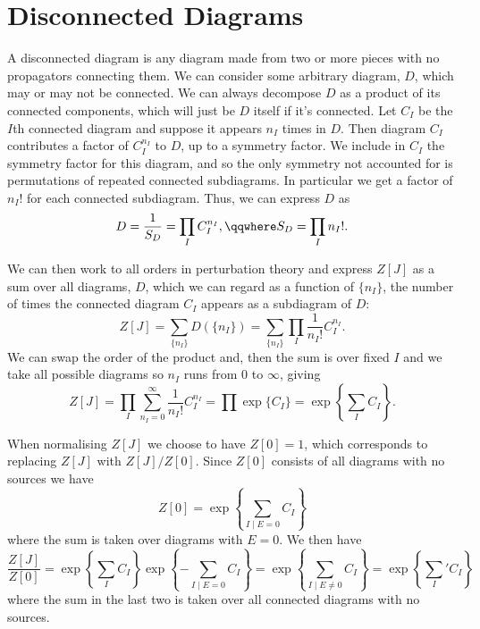 \documentclass[fleqn]{NotesClass}
\begin{document}
    \section{Disconnected Diagrams}\label{sec:disconnected diagrams}
    A disconnected diagram is any diagram made from two or more pieces with no propagators connecting them.
    We can consider some arbitrary diagram, \(D\), which may or may not be connected.
    We can always decompose \(D\) as a product of its connected components, which will just be \(D\) itself if it's connected.
    Let \(C_I\) be the \(I\)th connected diagram and suppose it appears \(n_I\) times in \(D\).
    Then diagram \(C_I\) contributes a factor of \(C_I^{n_I}\) to \(D\), up to a symmetry factor.
    We include in \(C_I\) the symmetry factor for this diagram, and so the only symmetry not accounted for is permutations of repeated connected subdiagrams.
    In particular we get a factor of \(n_I!\) for each connected subdiagram.
    Thus, we can express \(D\) as
    \begin{equation}
        D = \frac{1}{S_D} = \prod_I C_I^{n_I}, \qqwhere S_D = \prod_I n_I!.
    \end{equation}
    
    We can then work to all orders in perturbation theory and express \(Z[J]\) as a sum over all diagrams, \(D\), which we can regard as a function of \(\{n_I\}\), the number of times the connected diagram \(C_I\) appears as a subdiagram of \(D\):
    \begin{equation}
        Z[J] = \sum_{\{n_I\}} D(\{n_I\}) = \sum_{\{n_I\}} \prod _I \frac{1}{n_I!} C_I^{n_I}.
    \end{equation}
    We can swap the order of the product and, then the sum is over fixed \(I\) and we take all possible diagrams so \(n_I\) runs from 0 to \(\infty\), giving
    \begin{equation}
        Z[J] = \prod_I \sum_{n_I = 0}^{\infty} \frac{1}{n_I!} C_I^{n_I} = \prod \exp\{C_I\} = \exp\left\{ \sum_I C_I \right\}.
    \end{equation}
    
    When normalising \(Z[J]\) we choose to have \(Z[0] = 1\), which corresponds to replacing \(Z[J]\) with \(Z[J]/Z[0]\).
    Since \(Z[0]\) consists of all diagrams with no sources we have
    \begin{equation}
        Z[0] = \exp\left\{ \sum_{I \mid E = 0} C_I \right\}
    \end{equation}
    where the sum is taken over diagrams with \(E = 0\).
    We then have
    \begin{equation}
        \frac{Z[J]}{Z[0]} = \exp\left\{ \sum_I C_I \right\} \exp\left\{ -\sum_{I \mid E = 0} C_I \right\} = \exp\left\{ \sum_{I \mid E \ne 0} C_I \right\} = \exp\left\{ {\sum_I}' C_I \right\}
    \end{equation}
    where the sum in the last two is taken over all connected diagrams with no sources.
    
\end{document}
